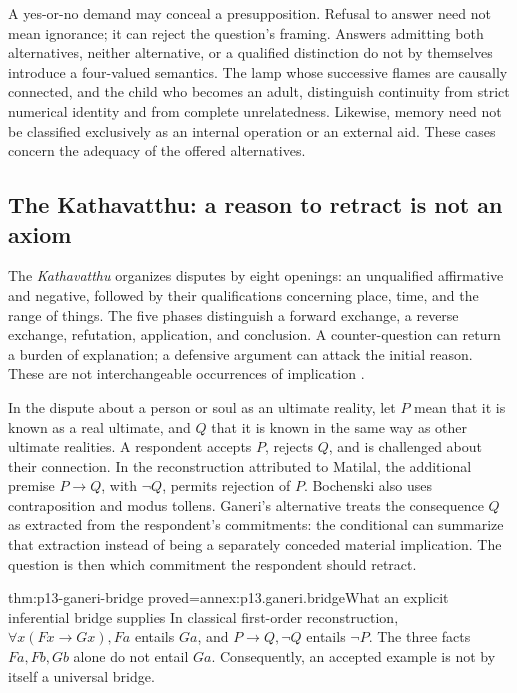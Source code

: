 A yes-or-no demand may conceal a presupposition. Refusal to answer need not
mean ignorance; it can reject the question's framing. Answers admitting both
alternatives, neither alternative, or a qualified distinction do not by
themselves introduce a four-valued semantics. The lamp whose successive flames
are causally connected, and the child who becomes an adult, distinguish
continuity from strict numerical identity and from complete unrelatedness.
Likewise, memory need not be classified exclusively as an internal operation
or an external aid. These cases concern the adequacy of the offered alternatives.

\subsection{The Kathavatthu: a reason to retract is not an axiom}

The \emph{Kathavatthu} organizes disputes by eight openings: an unqualified
affirmative and negative, followed by their qualifications concerning place,
time, and the range of things. The five phases distinguish a forward exchange,
a reverse exchange, refutation, application, and conclusion. A counter-question
can return a burden of explanation; a defensive argument can attack the
initial reason. These are not interchangeable occurrences of implication
\cite[pp.~314--321]{Ganeri2004IndianLogicPublished}.

In the dispute about a person or soul as an ultimate reality, let \(P\) mean
that it is known as a real ultimate, and \(Q\) that it is known in the same way
as other ultimate realities. A respondent accepts \(P\), rejects \(Q\), and is
challenged about their connection. In the reconstruction attributed to
Matilal, the additional premise \(P\to Q\), with \(\neg Q\), permits rejection
of \(P\). Bochenski also uses contraposition and modus tollens.
Ganeri's alternative treats the consequence \(Q\) as extracted from the
respondent's commitments: the conditional can summarize that extraction
instead of being a separately conceded material implication. The question
is then which commitment the respondent should retract.

\begin{hblemma}{thm:p13-ganeri-bridge}
 {proved=annex:p13.ganeri.bridge}{What an explicit inferential bridge supplies}
In classical first-order reconstruction,
\(\forall x(Fx\to Gx),Fa\) entails \(Ga\), and \(P\to Q,\neg Q\)
entails \(\neg P\). The three facts \(Fa,Fb,Gb\) alone do not entail \(Ga\).
Consequently, an accepted example is not by itself a universal bridge.
\end{hblemma}

